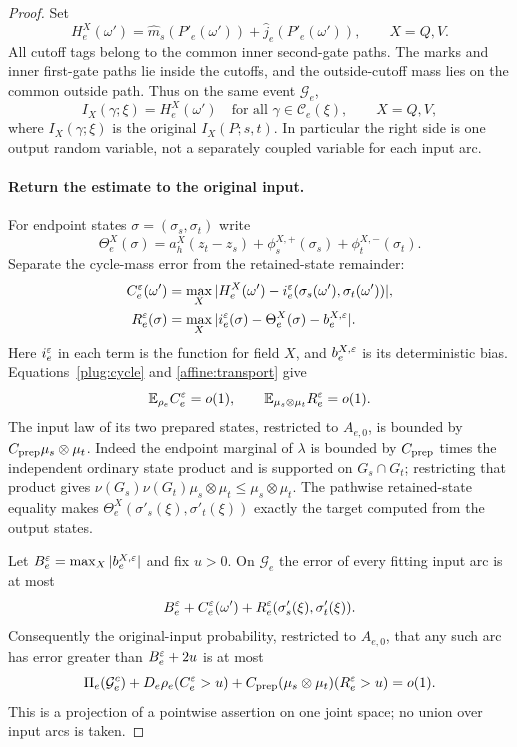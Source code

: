 \begin{proof}
Set
\[
 H_e^X(\omega')
  =\widehat m_s(P'_e(\omega'))+\widehat j_e(P'_e(\omega')),
                           \qquad X=Q,V.
\]
All cutoff tags belong to the common inner second-gate paths.
The marks and inner first-gate paths lie inside the cutoffs, and
the outside-cutoff mass lies on the common outside path.  Thus
on the same event $\mathcal G_e$,
\begin{equation}\label{actual:exact-comparison}
 I_X(\gamma;\xi)=H_e^X(\omega')
 \quad\text{for all }\gamma\in\mathscr C_e(\xi),\qquad X=Q,V,
\end{equation}
where $I_X(\gamma;\xi)$ is the original $I_X(P;s,t)$.
In particular the right side is one output random variable,
not a separately coupled variable for each input arc.

\paragraph{Return the estimate to the original input.}
For endpoint states $\sigma=(\sigma_s,\sigma_t)$ write
\[
 \Theta_e^X(\sigma)=a_h^X(z_t-z_s)
        +\phi_s^{X,+}(\sigma_s)+\phi_t^{X,-}(\sigma_t).
\]
Separate the cycle-mass error from the retained-state remainder:
\[
 \begin{aligned}
 C_e^\varepsilon(\omega')
   &=\max_X|H_e^X(\omega')
               -i_e^\varepsilon(\sigma_s(\omega'),\sigma_t(\omega'))|,\\
 R_e^\varepsilon(\sigma)
   &=\max_X|i_e^\varepsilon(\sigma)-\Theta_e^X(\sigma)-b_e^{X,\varepsilon}|.
 \end{aligned}
\]
Here $i_e^\varepsilon$ in each term is the function for field $X$, and
$b_e^{X,\varepsilon}$ is its deterministic bias.
Equations~\eqref{plug:cycle} and \eqref{affine:transport} give
\[
 \mathbb E_{\rho_e}C_e^\varepsilon=o(1),\qquad
 \mathbb E_{\mu_s\otimes\mu_t}R_e^\varepsilon=o(1).
\]
The input law of its two prepared states, restricted to
$A_{e,0}$, is bounded by $C_{\rm prep}\mu_s\otimes\mu_t$.
Indeed the endpoint marginal of $\lambda$ is bounded by
$C_{\rm prep}$ times the independent ordinary state product and is supported on
$G_s\cap G_t$; restricting that product gives
$\nu(G_s)\nu(G_t)\mu_s\otimes\mu_t\le\mu_s\otimes\mu_t$.
The pathwise retained-state equality makes
$\Theta_e^X(\sigma'_s(\xi),\sigma'_t(\xi))$ exactly the target
computed from the output states.

Let $B_e^\varepsilon=\max_X|b_e^{X,\varepsilon}|$ and fix $u>0$.
On $\mathcal G_e$ the error of every fitting input arc is at most
\[
 B_e^\varepsilon+C_e^\varepsilon(\omega')
             +R_e^\varepsilon(\sigma'_s(\xi),\sigma'_t(\xi)).
\]
Consequently the original-input probability, restricted to
$A_{e,0}$, that any such arc has error greater than
$B_e^\varepsilon+2u$ is at most
\[
 \Pi_e(\mathcal G_e^c)
 +D_e\rho_e(C_e^\varepsilon>u)
 +C_{\rm prep}(\mu_s\otimes\mu_t)(R_e^\varepsilon>u)=o(1).
\]
This is a projection of a pointwise assertion on one joint space;
no union over input arcs is taken.


\end{proof}
